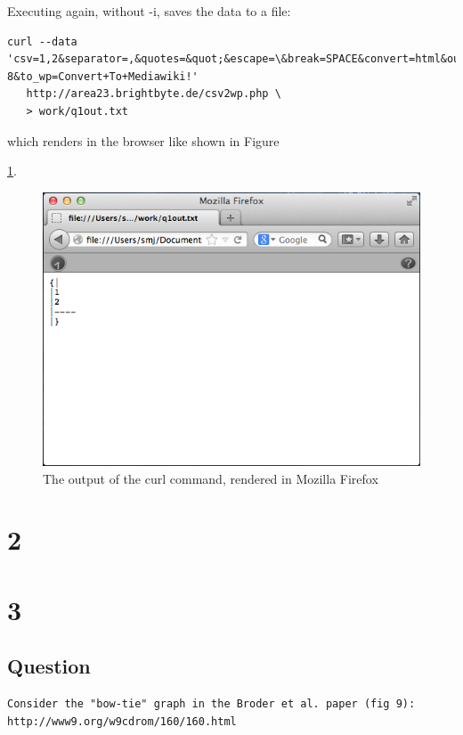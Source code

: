 \documentclass[letterpaper,11pt]{article}
\begin{document}
Executing again, without -i, saves the data to a file:
\begin{lstlisting}[frame=single]
curl --data 'csv=1,2&separator=,&quotes=&quot;&escape=\&break=SPACE&convert=html&output_encoding=UTF-8&to_wp=Convert+To+Mediawiki!'
   http://area23.brightbyte.de/csv2wp.php \
   > work/q1out.txt
\end{lstlisting}


which renders in the browser like shown in Figure {\ref{fig:q1screenie}.

\begin{figure}
\includegraphics[scale=0.7]{work/q1screenie.png}
\caption{The output of the curl command, rendered in Mozilla Firefox}
\label{fig:q1screenie}
\end{figure}




\newpage
\section*{2}

\newpage
\section*{3}

\subsection*{Question}

\begin{verbatim}
Consider the "bow-tie" graph in the Broder et al. paper (fig 9):
http://www9.org/w9cdrom/160/160.html


\end{verbatim}}
\end{document}
